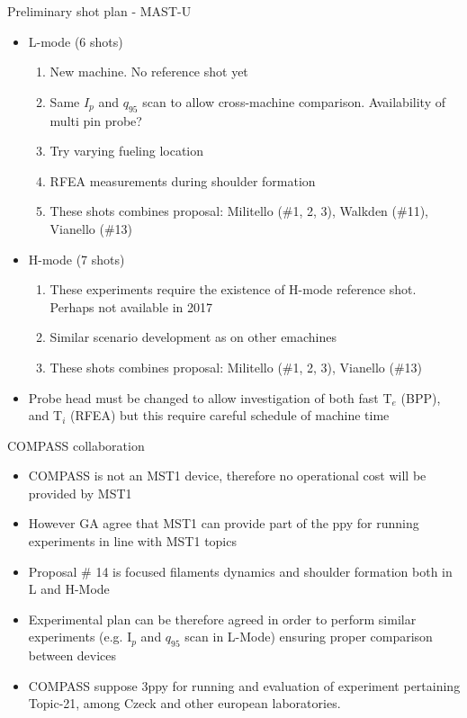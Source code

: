 \documentclass[10pt, compress]{beamer}
\begin{document}
\begin{frame}{Preliminary shot plan  - MAST-U}
	\begin{itemize}
		\item L-mode (6 shots)
		\begin{enumerate}		
			\item New machine. No reference shot yet			
			\item Same $I_p$ and $q_95$ scan to allow
                          cross-machine comparison. Availability of multi pin probe? 
			\item Try varying fueling location
			\item RFEA measurements during shoulder
                          formation 
                        \item These shots combines proposal: Militello
                          (\#1, 2, 3), Walkden (\#11), Vianello (\#13)
		\end{enumerate}
		\item H-mode (7 shots)
		\begin{enumerate}
			\item These experiments require the existence of H-mode reference shot. Perhaps not available in 2017
			\item Similar scenario development as on other emachines
                        \item These shots combines proposal: Militello
                          (\#1, 2, 3),  Vianello (\#13)
		\end{enumerate}
		\item Probe head must be changed to allow
                  investigation of both fast T$_e$ (BPP),  and T$_i$
                  (RFEA) but this require careful schedule of machine time
	\end{itemize}
\end{frame}

\begin{frame}{COMPASS collaboration}
\begin{itemize}
\item COMPASS is not an MST1 device, therefore no operational cost
  will be provided by MST1
\item However GA agree that MST1 can provide part of the ppy for
  running experiments in line with MST1 topics
\item Proposal \# 14 is focused filaments dynamics and shoulder
  formation both in L and H-Mode
\item Experimental plan can be therefore agreed in order to perform
  similar experiments (e.g. I$_p$ and $q_{95}$ scan in L-Mode)
  ensuring proper comparison between devices
\item COMPASS suppose 3ppy for running and evaluation of experiment
  pertaining Topic-21, among Czeck and other european laboratories.
\end{itemize}
\end{frame}
\end{document}
